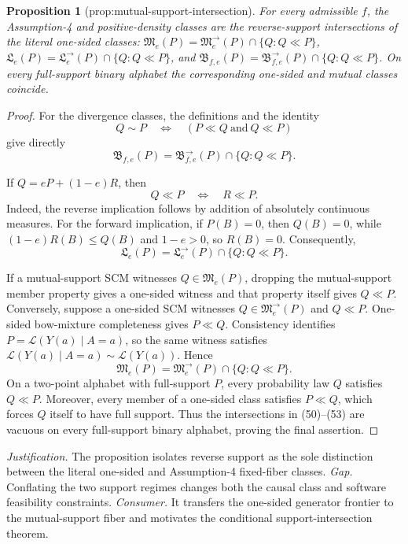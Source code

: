 \documentclass{article}
\newtheorem{proposition}{Proposition}
\begin{document}
\begin{proposition}[prop:mutual-support-intersection]\label{prop:mutual-support-intersection}
For every admissible \(f\), the Assumption-4 and positive-density classes are the reverse-support intersections of the literal one-sided classes: \(\mathfrak M_e(P)=\mathfrak M^{\to}_e(P)\cap\{Q:Q\ll P\}\), \(\mathfrak L_e(P)=\mathfrak L^{\to}_e(P)\cap\{Q:Q\ll P\}\), and \(\mathfrak B_{f,e}(P)=\mathfrak B^{\to}_{f,e}(P)\cap\{Q:Q\ll P\}\). On every full-support binary alphabet the corresponding one-sided and mutual classes coincide.
\end{proposition}
\begin{proof}
For the divergence classes, the definitions and the identity
\[
 Q\sim P\quad\Longleftrightarrow\quad(P\ll Q\ \text{and}\ Q\ll P)
\]
give directly
\[
 \mathfrak B_{f,e}(P)
 =\mathfrak B^{\to}_{f,e}(P)\cap\{Q:Q\ll P\}. \tag{50}
\]

If \(Q=eP+(1-e)R\), then
\[
 Q\ll P\quad\Longleftrightarrow\quad R\ll P. \tag{51}
\]
Indeed, the reverse implication follows by addition of absolutely continuous measures.  For the forward implication, if \(P(B)=0\), then \(Q(B)=0\), while \((1-e)R(B)\le Q(B)\) and \(1-e>0\), so \(R(B)=0\).  Consequently,
\[
 \mathfrak L_e(P)
 =\mathfrak L^{\to}_e(P)\cap\{Q:Q\ll P\}. \tag{52}
\]

If a mutual-support SCM witnesses \(Q\in\mathfrak M_e(P)\), dropping the mutual-support member property gives a one-sided witness and that property itself gives \(Q\ll P\).  Conversely, suppose a one-sided SCM witnesses \(Q\in\mathfrak M^{\to}_e(P)\) and \(Q\ll P\).  One-sided bow-mixture completeness gives \(P\ll Q\).  Consistency identifies \(P=\mathcal L(Y(a)\mid A=a)\), so the same witness satisfies \(\mathcal L(Y(a)\mid A=a)\sim\mathcal L(Y(a))\).  Hence
\[
 \mathfrak M_e(P)
 =\mathfrak M^{\to}_e(P)\cap\{Q:Q\ll P\}. \tag{53}
\]
On a two-point alphabet with full-support \(P\), every probability law \(Q\) satisfies \(Q\ll P\).  Moreover, every member of a one-sided class satisfies \(P\ll Q\), which forces \(Q\) itself to have full support.  Thus the intersections in (50)--(53) are vacuous on every full-support binary alphabet, proving the final assertion.
\end{proof}
\par\smallskip\noindent \textit{Justification.} The proposition isolates reverse support as the sole distinction between the literal one-sided and Assumption-4 fixed-fiber classes. \textit{Gap.} Conflating the two support regimes changes both the causal class and software feasibility constraints. \textit{Consumer.} It transfers the one-sided generator frontier to the mutual-support fiber and motivates the conditional support-intersection theorem.
\end{document}
